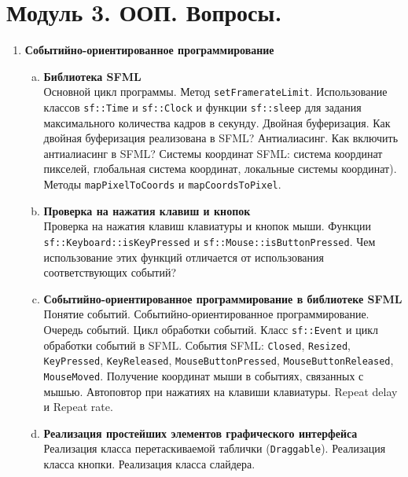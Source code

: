 \documentclass{article}
\begin{document}

\section*{Модуль 3. ООП. Вопросы.}
\begin{enumerate}

\item \textbf{Событийно-ориентированное программирование}
\begin{enumerate}[a.]
\item \textbf{Библиотека SFML}\\
Основной цикл программы. Метод \texttt{setFramerateLimit}. Использование классов \texttt{sf::Time} и \texttt{sf::Clock} и функции \texttt{sf::sleep} для задания максимального количества кадров в секунду. Двойная буферизация. Как двойная буферизация реализована в SFML? Антиалиасинг. Как включить антиалиасинг в SFML? Системы координат SFML: система координат пикселей, глобальная система координат, локальные системы координат). Методы \texttt{mapPixelToCoords} и \texttt{mapCoordsToPixel}. 

\item \textbf{Проверка на нажатия клавиш и кнопок}\\
Проверка на нажатия клавиш клавиатуры и кнопок мыши. Функции \texttt{sf::Keyboard::isKeyPressed} и \texttt{sf::Mouse::isButtonPressed}. Чем использование этих функций отличается от использования соответствующих событий?


\item \textbf{Событийно-ориентированное программирование в библиотеке SFML}\\
Понятие событий. Событийно-ориентированное программирование. Очередь событий. Цикл обработки событий. Класс \texttt{sf::Event} и цикл обработки событий в SFML.
События SFML: \texttt{Closed}, \texttt{Resized}, \texttt{KeyPressed}, \texttt{KeyReleased}, \texttt{MouseButtonPressed},  \texttt{MouseButtonReleased}, \texttt{MouseMoved}. Получение координат мыши в событиях, связанных с мышью. Автоповтор при нажатиях на клавиши клавиатуры. Repeat delay и Repeat rate.

\item \textbf{Реализация простейших элементов графического интерфейса}
Реализация класса перетаскиваемой таблички (\texttt{Draggable}). Реализация класса кнопки. Реализация класса слайдера.
\end{enumerate}






\end{enumerate}
\end{document}
